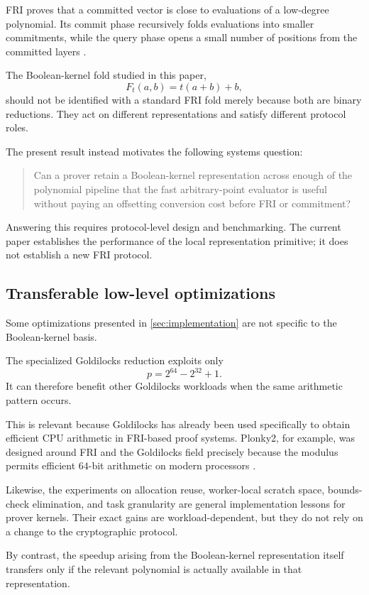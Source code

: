 FRI proves that a committed vector is close to evaluations of a low-degree
polynomial.  Its commit phase recursively folds evaluations into smaller
commitments, while the query phase opens a small number of positions from
the committed layers \cite{risc0fri}.

The Boolean-kernel fold studied in this paper,
\[
F_t(a,b)=t(a+b)+b,
\]
should not be identified with a standard FRI fold merely because both are
binary reductions.  They act on different representations and satisfy
different protocol roles.

The present result instead motivates the following systems question:

\begin{quote}
Can a prover retain a Boolean-kernel representation across enough of the
polynomial pipeline that the fast arbitrary-point evaluator is useful
without paying an offsetting conversion cost before FRI or commitment?
\end{quote}

Answering this requires protocol-level design and benchmarking.  The current
paper establishes the performance of the local representation primitive;
it does not establish a new FRI protocol.

\subsection{Transferable low-level optimizations}

Some optimizations presented in \cref{sec:implementation} are not specific
to the Boolean-kernel basis.

The specialized Goldilocks reduction exploits only
\[
p=2^{64}-2^{32}+1.
\]
It can therefore benefit other Goldilocks workloads when the same arithmetic
pattern occurs.

This is relevant because Goldilocks has already been used specifically to
obtain efficient CPU arithmetic in FRI-based proof systems.  Plonky2, for
example, was designed around FRI and the Goldilocks field precisely because
the modulus permits efficient \(64\)-bit arithmetic on modern processors
\cite{plonky2intro}.

Likewise, the experiments on allocation reuse, worker-local scratch space,
bounds-check elimination, and task granularity are general implementation
lessons for prover kernels.  Their exact gains are workload-dependent, but
they do not rely on a change to the cryptographic protocol.

By contrast, the speedup arising from the Boolean-kernel representation
itself transfers only if the relevant polynomial is actually available in
that representation.

